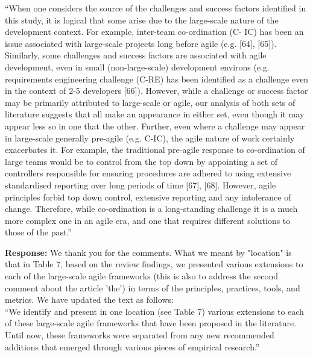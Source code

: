 \documentclass[a4paper,twoside,11pt]{reviewresponse}
\begin{document}
``When one considers the source of the challenges and success factors identified in this study, it is logical that some arise due to the large-scale nature of the development context. For example, inter-team co-ordination (C- IC) has been an issue associated with large-scale projects long before agile (e.g. [64], [65]). Similarly, some challenges and success factors are associated with agile development, even in small (non-large-scale) development environs (e.g. requirements engineering challenge (C-RE) has been identified as a challenge even in the context of 2-5 developers [66]). However, while a challenge or success factor may be primarily attributed to large-scale or agile, our analysis of both sets of literature suggests that all make an appearance in either set, even though it may appear less so in one that the other. Further, even where a challenge may appear in large-scale generally pre-agile (e.g. C-IC), the agile nature of work certainly exacerbates it. For example, the traditional pre-agile response to co-ordination of large teams would be to control from the top down by appointing a set of controllers responsible for ensuring procedures are adhered to using extensive standardised reporting over long periods of time [67], [68]. However, agile principles forbid top down control, extensive reporting and any intolerance of change. Therefore, while co-ordination is a long-standing challenge it is a much more complex one in an agile era, and one that requires different solutions to those of the past.''


\textbf{Response:}
We thank you for the comments. What we meant by "location" is that in Table 7, based on the review findings, we presented various extensions to each of the large-scale agile frameworks (this is also to address the second comment about the article 'the') in terms of the principles, practices, tools, and metrics. We have updated the text as follows: \\
``We identify and present in one location (see Table 7) various extensions to each of these large-scale agile frameworks that have been proposed in the literature. Until now, these frameworks were separated from any new recommended additions that emerged through various pieces of empirical research.''
\end{document}
